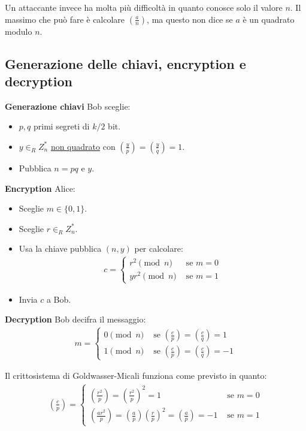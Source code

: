 \noindent Un attaccante invece ha molta più difficoltà in quanto conosce solo il valore $n$. Il massimo che può fare è calcolare $\left(\frac{a}{n}\right)$, ma questo non dice se $a$ è un quadrato modulo $n$.

\subsection{Generazione delle chiavi, encryption e decryption}

\textbf{Generazione chiavi}
\noindent Bob sceglie:
\begin{itemize}
    \item $p, q$ primi segreti  di $k/2$ bit.
    \item $y \in_R Z_n^*$ \underline{non quadrato} con $(\frac{y}{p}) = (\frac{y}{q}) = 1$.
    \item Pubblica $n = pq$ e $y$.
\end{itemize}

\noindent \textbf{Encryption}
\noindent Alice:
\begin{itemize}
    \item Sceglie $m \in \{0, 1\}$.
    \item Sceglie $r \in_R Z_n^*$.
    \item Usa la chiave pubblica $(n, y)$ per calcolare:
    \begin{align*}
        c = \begin{cases}
                r^2 \pmod n & \text{ se } m=0\\
                yr^2 \pmod n & \text{ se } m=1
        \end{cases}
    \end{align*}
    \item Invia $c$ a Bob.
\end{itemize}

\noindent \textbf{Decryption}
\noindent Bob decifra il messaggio:
\begin{align*}
    m = \begin{cases}
                0 \pmod n & \text{ se } \left(\frac{c}{p} \right) = \left(\frac{c}{q} \right) = 1\\
                1 \pmod n & \text{ se } \left(\frac{c}{p} \right) = \left(\frac{c}{q} \right) = -1
        \end{cases}
\end{align*}

\noindent Il crittosistema di Goldwasser-Micali funziona come previsto in quanto:
\begin{align*}
    \left(\frac{c}{p} \right) = 
        \begin{cases}
                \left(\frac{r^2}{p} \right) = \left(\frac{r^2}{p} \right)^2 = 1 & \text{ se } m = 0\\
                \left(\frac{ar^2}{p} \right) = \left(\frac{a}{p} \right)\left(\frac{r}{p} \right)^2 = \left(\frac{a}{p} \right) = -1 & \text{ se } m = 1
        \end{cases}
\end{align*}

